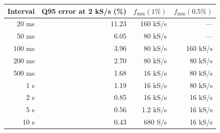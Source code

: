 \begin{tabular}{@{}rrrr@{}}
\toprule
Interval & Q95 error at 2 kS/s (\%) & $f_{\min}(1\%)$ & $f_{\min}(0.5\%)$ \\
\midrule
20 ms & 11.23 & 160 kS/s & --- \\
50 ms & 6.05 & 80 kS/s & --- \\
100 ms & 3.96 & 80 kS/s & 160 kS/s \\
200 ms & 2.70 & 80 kS/s & 80 kS/s \\
500 ms & 1.68 & 16 kS/s & 80 kS/s \\
1 s & 1.19 & 16 kS/s & 80 kS/s \\
2 s & 0.85 & 16 kS/s & 16 kS/s \\
5 s & 0.56 & 1.2 kS/s & 16 kS/s \\
10 s & 0.43 & 680 S/s & 16 kS/s \\
\bottomrule
\end{tabular}

